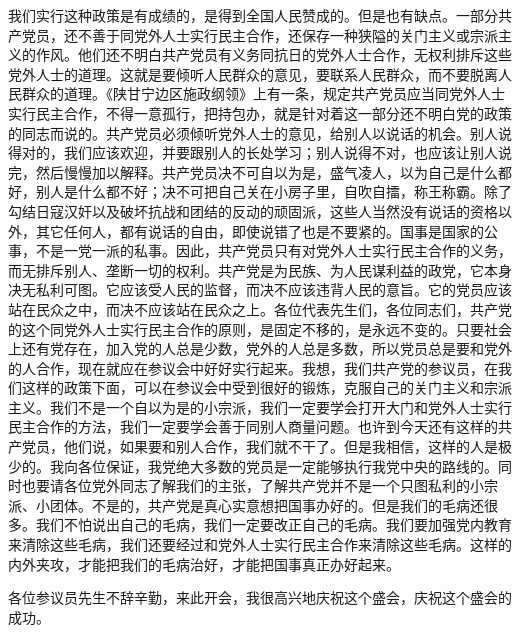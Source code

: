我们实行这种政策是有成绩的，是得到全国人民赞成的。但是也有缺点。一部分共产党员，还不善于同党外人士实行民主合作，还保存一种狭隘的关门主义或宗派主义的作风。他们还不明白共产党员有义务同抗日的党外人士合作，无权利排斥这些党外人士的道理。这就是要倾听人民群众的意见，要联系人民群众，而不要脱离人民群众的道理。《陕甘宁边区施政纲领》上有一条，规定共产党员应当同党外人士实行民主合作，不得一意孤行，把持包办，就是针对着这一部分还不明白党的政策的同志而说的。共产党员必须倾听党外人士的意见，给别人以说话的机会。别人说得对的，我们应该欢迎，并要跟别人的长处学习；别人说得不对，也应该让别人说完，然后慢慢加以解释。共产党员决不可自以为是，盛气凌人，以为自己是什么都好，别人是什么都不好；决不可把自己关在小房子里，自吹自擂，称王称霸。除了勾结日寇汉奸以及破坏抗战和团结的反动的顽固派，这些人当然没有说话的资格以外，其它任何人，都有说话的自由，即使说错了也是不要紧的。国事是国家的公事，不是一党一派的私事。因此，共产党员只有对党外人士实行民主合作的义务，而无排斥别人、垄断一切的权利。共产党是为民族、为人民谋利益的政党，它本身决无私利可图。它应该受人民的监督，而决不应该违背人民的意旨。它的党员应该站在民众之中，而决不应该站在民众之上。各位代表先生们，各位同志们，共产党的这个同党外人士实行民主合作的原则，是固定不移的，是永远不变的。只要社会上还有党存在，加入党的人总是少数，党外的人总是多数，所以党员总是要和党外的人合作，现在就应在参议会中好好实行起来。我想，我们共产党的参议员，在我们这样的政策下面，可以在参议会中受到很好的锻炼，克服自己的关门主义和宗派主义。我们不是一个自以为是的小宗派，我们一定要学会打开大门和党外人士实行民主合作的方法，我们一定要学会善于同别人商量问题。也许到今天还有这样的共产党员，他们说，如果要和别人合作，我们就不干了。但是我相信，这样的人是极少的。我向各位保证，我党绝大多数的党员是一定能够执行我党中央的路线的。同时也要请各位党外同志了解我们的主张，了解共产党并不是一个只图私利的小宗派、小团体。不是的，共产党是真心实意想把国事办好的。但是我们的毛病还很多。我们不怕说出自己的毛病，我们一定要改正自己的毛病。我们要加强党内教育来清除这些毛病，我们还要经过和党外人士实行民主合作来清除这些毛病。这样的内外夹攻，才能把我们的毛病治好，才能把国事真正办好起来。

各位参议员先生不辞辛勤，来此开会，我很高兴地庆祝这个盛会，庆祝这个盛会的成功。
